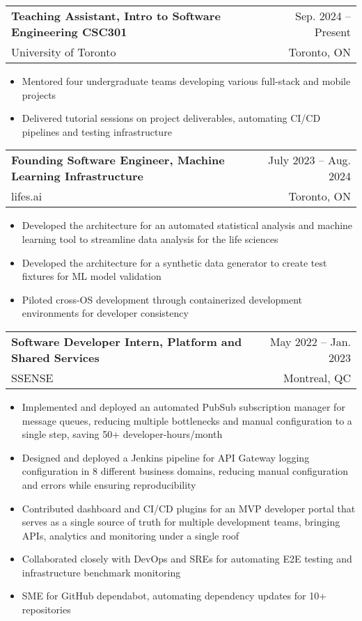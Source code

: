 \documentclass[letterpaper,11pt]{article}
\makeatletter
\newcommand{\resumeItem}[1]{
  \item\small{
    {#1 \vspace{-2pt}}
  }
}
\newcommand{\resumeSubheading}[4]{
  \vspace{-2pt}\item
    \begin{tabular*}{0.97\textwidth}[t]{l@{\extracolsep{\fill}}r}
      \textbf{#1} & #2 \\
      \small{#3} & \small{#4} \\
    \end{tabular*}\vspace{-7pt}
}
\newcommand{\resumeSubSubheading}[2]{
    \item
    \begin{tabular*}{0.97\textwidth}{l@{\extracolsep{\fill}}r}
      \textit{\small#1} & \small #2 \\
    \end{tabular*}\vspace{-7pt}
}
\newcommand{\resumeSubHeadingListEnd}{\end{itemize}}
\newcommand{\resumeItemListStart}{\begin{itemize}}
\newcommand{\resumeItemListEnd}{\end{itemize}\vspace{-5pt}}
\makeatother
\begin{document}
    \resumeSubheading
      {Teaching Assistant, Intro to Software Engineering CSC301}{Sep. 2024 -- Present}
      {University of Toronto}{Toronto, ON}
      \resumeItemListStart
        \resumeItem{Mentored four undergraduate teams developing various full-stack and mobile projects}
        \resumeItem{Delivered tutorial sessions on project deliverables, automating CI/CD pipelines and testing infrastructure}
      \resumeItemListEnd
      

    \resumeSubheading
      {Founding Software Engineer, Machine Learning Infrastructure}{July 2023 -- Aug. 2024}
      {lifes.ai}{Toronto, ON}
      \resumeItemListStart
        \resumeItem{Developed the architecture for an automated statistical analysis and machine learning tool to streamline data analysis for the life sciences}
        \resumeItem{Developed the architecture for a synthetic data generator to create test fixtures for ML model validation}
        \resumeItem{Piloted cross-OS development through containerized development environments for developer consistency}
    \resumeItemListEnd

    \resumeSubheading
      {Software Developer Intern, Platform and Shared Services}{May 2022 -- Jan. 2023}
      {SSENSE}{Montreal, QC}
      \resumeItemListStart
        \resumeItem{Implemented and deployed an automated PubSub subscription manager for message queues, reducing multiple bottlenecks and manual configuration to a single step, saving 50+ developer-hours/month}
        \resumeItem{Designed and deployed a Jenkins pipeline for API Gateway logging configuration in 8 different business domains, reducing manual configuration and errors while ensuring reproducibility}
        \resumeItem{Contributed dashboard and CI/CD plugins for an MVP developer portal that serves as a single source of truth for multiple development teams, bringing APIs, analytics and monitoring under a single roof}
        \resumeItem{Collaborated closely with DevOps and SREs for automating E2E testing and infrastructure benchmark monitoring}
        \resumeItem{SME for GitHub dependabot, automating dependency updates for 10+ repositories}
      \resumeItemListEnd
    
\end{document}
